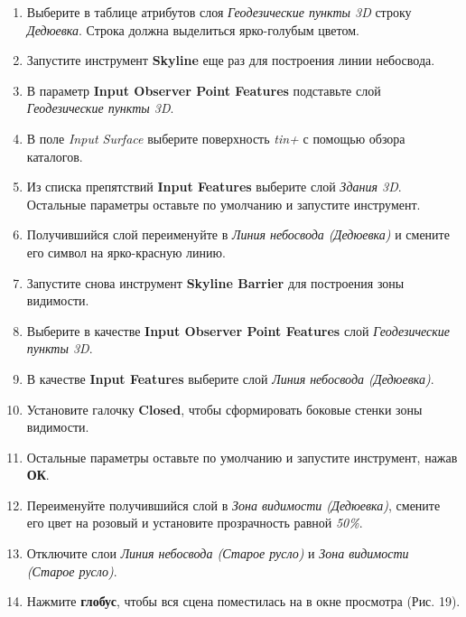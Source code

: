 \documentclass[]{book}
\theoremstyle{definition}
\theoremstyle{definition}
\theoremstyle{definition}
\theoremstyle{remark}
\begin{document}
\begin{enumerate}
\def\labelenumi{\arabic{enumi}.}
\item
  Выберите в таблице атрибутов слоя \emph{Геодезические пункты 3D}
  строку \emph{Дедюевка}. Строка должна выделиться ярко-голубым цветом.
\item
  Запустите инструмент \textbf{Skyline} еще раз для построения линии
  небосвода.
\item
  В параметр \textbf{Input Observer Point Features} подставьте слой
  \emph{Геодезические пункты 3D}.
\item
  В поле \emph{Input Surface} выберите поверхность \emph{tin+} с помощью
  обзора каталогов.
\item
  Из списка препятствий \textbf{Input Features} выберите слой
  \emph{Здания 3D}. Остальные параметры оставьте по умолчанию и
  запустите инструмент.
\item
  Получившийся слой переименуйте в \emph{Линия небосвода (Дедюевка)} и
  смените его символ на ярко-красную линию.
\item
  Запустите снова инструмент \textbf{Skyline Barrier} для построения
  зоны видимости.
\item
  Выберите в качестве \textbf{Input Observer Point Features} слой
  \emph{Геодезические пункты 3D}.
\item
  В качестве \textbf{Input Features} выберите слой \emph{Линия небосвода
  (Дедюевка)}.
\item
  Установите галочку \textbf{Closed}, чтобы сформировать боковые стенки
  зоны видимости.
\item
  Остальные параметры оставьте по умолчанию и запустите инструмент,
  нажав \textbf{ОК}.
\item
  Переименуйте получившийся слой в \emph{Зона видимости (Дедюевка)},
  смените его цвет на розовый и установите прозрачность равной
  \emph{50\%}.
\item
  Отключите слои \emph{Линия небосвода (Старое русло)} и \emph{Зона
  видимости (Старое русло)}.
\item
  Нажмите \textbf{глобус}, чтобы вся сцена поместилась на в окне
  просмотра (Рис. 19).


\end{enumerate}
\end{document}
